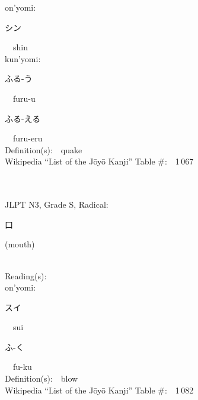 \begin{multicols}{2}
{\hspace*{1em}}on'yomi:\ \ \\
{\hspace*{2em}}{\begin{CJK}{UTF8}{min} シン \end{CJK}}\ \ shin\ \ \\
{\hspace*{1em}}kun'yomi:\ \ \\
{\hspace*{2em}}{\begin{CJK}{UTF8}{min} ふる-う \end{CJK}}\ \ furu-u\ \ \\
{\hspace*{2em}}{\begin{CJK}{UTF8}{min} ふる-える \end{CJK}}\ \ furu-eru\ \ \\
Definition(s):\ \ quake \\
Wikipedia ``List of the J\=oy\=o Kanji'' Table \#:\ \ 1\,067 \\
\ \ \\
{\fontsize{34pt}{40pt}  }\ \ \\  %
{JLPT N3, Grade S, Radical:\ \ {\begin{CJK}{UTF8}{min} 口 \end{CJK}} (mouth) } \\
Reading(s):\ \ \\
{\hspace*{1em}}on'yomi:\ \ \\
{\hspace*{2em}}{\begin{CJK}{UTF8}{min} スイ \end{CJK}}\ \ sui\ \ \\
{\hspace*{2em}}{\begin{CJK}{UTF8}{min} ふ-く \end{CJK}}\ \ fu-ku\ \ \\
Definition(s):\ \ blow \\
Wikipedia ``List of the J\=oy\=o Kanji'' Table \#:\ \ 1\,082 \\
\ \ \\
{\fontsize{34pt}{40pt}  }\ \ \\  %

\end{multicols}
